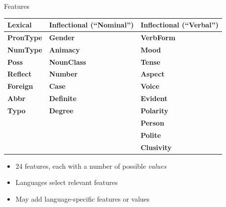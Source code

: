 \documentclass[10pt, compress, aspectratio=169]{beamer}
\newcommand{\feat}[1]{\textbf{\footnotesize\color{red}#1}}
\begin{document}
\begin{frame}{Features}
\begin{center}
\begin{tabularx}{0.75\textwidth}{X|X|X}
\textbf{Lexical} & \textbf{Inflectional (``Nominal'')} & \textbf{Inflectional (``Verbal'')} \\\hline
\feat{PronType} & \feat{Gender}    & \feat{VerbForm}  \\
\feat{NumType}  & \feat{Animacy}   & \feat{Mood}      \\
\feat{Poss}     & \feat{NounClass} & \feat{Tense}     \\
\feat{Reflect}  & \feat{Number}    & \feat{Aspect}    \\
\feat{Foreign}  & \feat{Case}      & \feat{Voice}     \\
\feat{Abbr}     & \feat{Definite}  & \feat{Evident}   \\
\feat{Typo}     & \feat{Degree}    & \feat{Polarity}  \\
                &                  & \feat{Person}    \\
                &                  & \feat{Polite}    \\
                &                  & \feat{Clusivity} \\
\end{tabularx}
\end{center}

\begin{itemize}
\item 24 features, each with a number of possible \textit{values}
\item Languages select relevant features
\item May add language-specific features or values
\end{itemize}
\end{frame}
\end{document}
